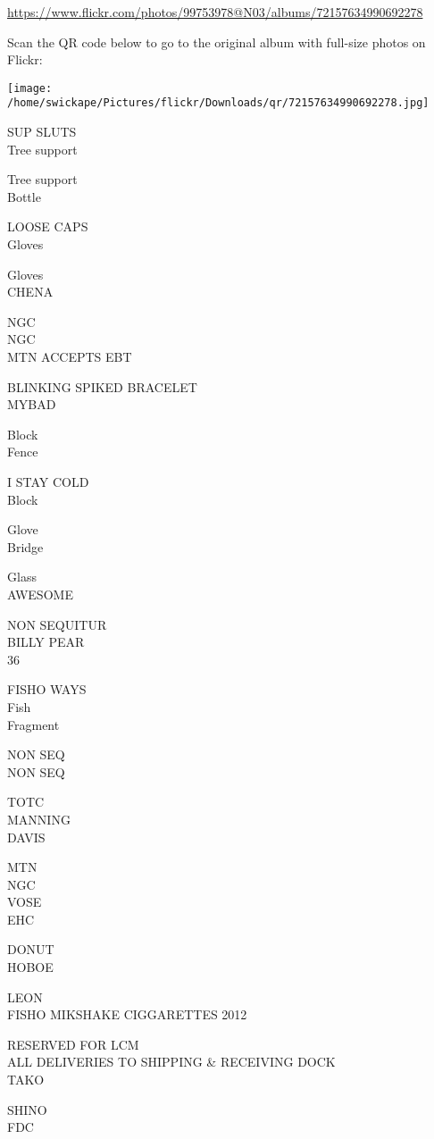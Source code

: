 \documentclass[10pt,letterpaper]{article}
\begin{document}
\url{https://www.flickr.com/photos/99753978@N03/albums/72157634990692278}

Scan the QR code below to go to the original album with full-size photos on Flickr:

\texttt{[image: /home/swickape/Pictures/flickr/Downloads/qr/72157634990692278.jpg]}


SUP SLUTS\\
Tree support

Tree support\\
Bottle

LOOSE CAPS\\
Gloves

Gloves\\
CHENA

NGC\\
NGC\\
MTN ACCEPTS EBT

BLINKING SPIKED BRACELET\\
MYBAD

Block\\
Fence

I STAY COLD\\
Block

Glove\\
Bridge

Glass\\
AWESOME

NON SEQUITUR\\
BILLY PEAR\\
36

FISHO WAYS\\
Fish\\
Fragment

NON SEQ\\
NON SEQ

TOTC\\
MANNING\\
DAVIS

MTN\\
NGC\\
VOSE\\
EHC

DONUT\\
HOBOE

LEON\\
FISHO MIKSHAKE CIGGARETTES 2012

RESERVED FOR LCM\\
ALL DELIVERIES TO SHIPPING \& RECEIVING DOCK\\
TAKO

SHINO\\
FDC
\end{document}
